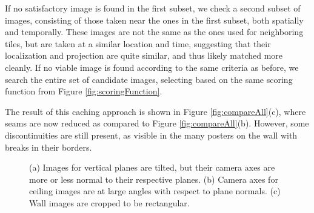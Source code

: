 \documentclass[]{spie}  %
\begin{document}
If no satisfactory image is found in the first subset, we check a
second subset of images, consisting of those taken near the ones in
the first subset, both spatially and temporally. These images are not
the same as the ones used for neighboring tiles, but are taken at a
similar location and time, suggesting that their localization and
projection are quite similar, and thus likely matched more cleanly. If
no viable image is found according to the same criteria as before, we
search the entire set of candidate images, selecting based on the same
scoring function from Figure \ref{fig:scoringFunction}.

The result of this caching approach is shown in Figure
\ref{fig:compareAll}(c), where seams are now reduced as compared to
Figure \ref{fig:compareAll}(b). However, some discontinuities are
still present, as visible in the many posters on the wall with breaks
in their borders.

\begin{figure}
  \centering
  \centering
  \centering
  \caption{(a) Images for vertical planes are tilted, but their camera
    axes are more or less normal to their respective planes. (b)
    Camera axes for ceiling images are at large angles with respect to
    plane normals. (c) Wall images are cropped to be rectangular.}
  \label{fig:projectionAngles}
\end{figure}
\end{document}
